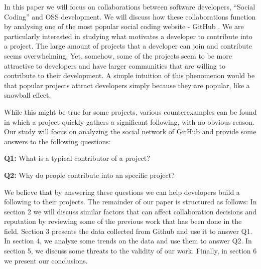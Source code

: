 In this paper we will focus on collaborations between software developers, ``Social Coding'' and OSS development. We will discuss how these collaborations function by analysing one of the most popular social coding website - GitHub \cite{GitHub}. We are particularly interested in studying what motivates a developer to contribute into a project. The large amount of projects that a developer can join and contribute seems overwhelming. Yet, somehow, some of the projects seem to be more attractive to developers and have larger communities that are willing to  contribute to their development. A simple intuition of this phenomenon would be that popular projects attract developers simply because they are popular, like a snowball effect.

While this might be true for some projects, various counterexamples can be found in which a project quickly gathers a significant following, with no obvious reason. Our study will focus on analyzing the social network of GitHub and provide some answers to the following questions:

\textbf{Q1:} What is a typical contributor of a project?

\textbf{Q2:} Why do people contribute into an specific project?

We believe that by answering these questions we can help developers build a following to their projects. The remainder of our paper is structured as follows: In section 2 we will discuss similar factors that can affect collaboration decisions and reputation by reviewing some of the previous work that has been done in the field. Section 3 presents the data collected from Github and use it to answer Q1. In section 4, we analyze some trends on the data and use them to answer Q2. In section 5, we discuss some threats to the validity of our work. Finally, in section 6 we present our conclusions.
